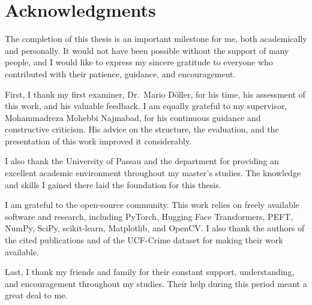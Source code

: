 \chapter*{Acknowledgments}

The completion of this thesis is an important milestone for me, both academically and personally. It would not have been possible without the support of many people, and I would like to express my sincere gratitude to everyone who contributed with their patience, guidance, and encouragement.

First, I thank my first examiner, Dr.\ Mario D\"oller, for his time, his assessment of this work, and his valuable feedback. I am equally grateful to my supervisor, Mohammadreza Mohebbi Najmabad, for his continuous guidance and constructive criticism. His advice on the structure, the evaluation, and the presentation of this work improved it considerably.

I also thank the University of Passau and the department for providing an excellent academic environment throughout my master's studies. The knowledge and skills I gained there laid the foundation for this thesis.

I am grateful to the open-source community. This work relies on freely available software and research, including PyTorch, Hugging Face Transformers, PEFT, NumPy, SciPy, scikit-learn, Matplotlib, and OpenCV. I also thank the authors of the cited publications and of the UCF-Crime dataset for making their work available.

Last, I thank my friends and family for their constant support, understanding, and encouragement throughout my studies. Their help during this period meant a great deal to me.
